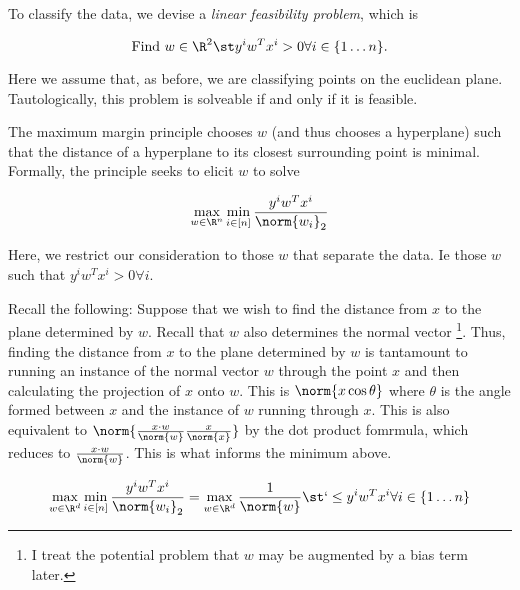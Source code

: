 \documentclass[../main.tex]{subfiles}
\begin{document}
\begin{remark}
    To classify the data, we devise a \textit{linear feasibility problem}, which is 

    \[
        \text{Find } w \in \R^2 \st y^{i}w^Tx^{i} > 0 \forall i \in \{1 \dots n\}.
    \]

    Here we assume that, as before, we are classifying points on the euclidean plane.
    Tautologically, this problem is solveable if and only if it is feasible.
\end{remark}

\begin{definition}
    The maximum margin principle chooses $w$ (and thus chooses a hyperplane) such that
    the distance of a hyperplane to its closest surrounding point is minimal. Formally,
    the principle seeks to elicit $w$ to solve

    \[
        \max_{w \in \R^n} \min_{i \in [n]} \frac{y^{i}w^Tx^{i}}{\norm{w_{i}}_2}
    \]

    Here, we restrict our consideration to those $w$ that separate the data. Ie those
    $w$ such that $y^{i}w^T x^{i}> 0 \forall i$.

\end{definition}

\begin{remark}
    Recall the following: Suppose that we wish to find the distance from $x$ to the plane
    determined by $w$. Recall that $w$ also determines the normal vector \footnote{I
    treat the potential problem that $w$ may be augmented by a bias term later.}. Thus,
    finding the distance from $x$ to the plane determined by $w$ is tantamount to running
    an instance of the normal vector $w$ through the point $x$ and then calculating the
    projection of $x$ onto $w$. This is $\norm{x \cos \theta}$ where $\theta$ is the angle
    formed between $x$ and the instance of $w$ running through $x$. This is also equivalent
    to $\norm{\frac{x \cdot w}{\norm{w}}\frac{x}{\norm{x}}}$ by the dot product fomrmula,
    which reduces to $\frac{x \cdot w}{\norm{w}}$. This is what informs the minimum above.
\end{remark}

\begin{proposition}
    \[
        \max_{w \in \R^d} \min_{i \in [n]} \frac{y^{i}w^Tx^{i}}{\norm{w_{i}}_2} = \max_{w \in \R^d} \frac{1}{\norm{w}} \st ` \leq y^{i}w^Tx^{i} \forall i \in \{1 \dots n\}
    \]
\end{proposition}
\end{document}
